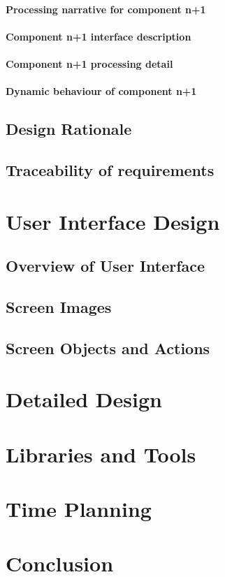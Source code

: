 \documentclass[]{report}
\begin{document}
\subsubsection{Processing narrative for component n+1}
\subsubsection{Component n+1 interface description}
\subsubsection{Component n+1 processing detail}
\subsubsection{Dynamic behaviour of component n+1}
\section{Design Rationale}
\section{Traceability of requirements}

\chapter{User Interface Design}
\section{Overview of User Interface}
\section{Screen Images}
\section{Screen Objects and Actions}

\chapter{Detailed Design}

\chapter{Libraries and Tools}

\chapter{Time Planning}

\chapter{Conclusion}



\end{document}
